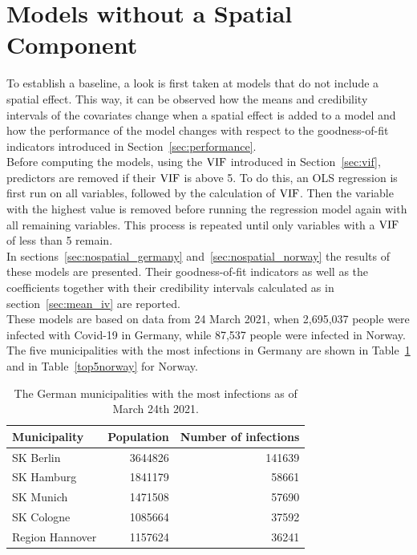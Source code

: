 \section{Models without a Spatial Component}\label{sec:nospatial}
To establish a baseline, a look is first taken at models that do not include a spatial effect. This way, it can be observed how the means and credibility intervals of the covariates change when a spatial effect is added to a model and how the performance of the model changes with respect to the goodness-of-fit indicators introduced in Section~\ref{sec:performance}. \\
Before computing the models, using the $\hbox{VIF}$ introduced in Section~\ref{sec:vif}, predictors are removed if their $\hbox{VIF}$ is above 5. To do this, an OLS regression is first run on all variables, followed by the calculation of $\hbox{VIF}$. Then the variable with the highest value is removed before running the regression model again with all remaining variables. This process is repeated until only variables with a $\hbox{VIF}$ of less than 5 remain. \\
In sections~\ref{sec:nospatial_germany} and~\ref{sec:nospatial_norway} the results of these models are presented. Their goodness-of-fit indicators as well as the coefficients together with their credibility intervals calculated as in section~\ref{sec:mean_iv} are reported. \\
These models are based on data from 24 March 2021, when 2,695,037 people were infected with Covid-19 in Germany, while 87,537 people were infected in Norway. The five municipalities with the most infections in Germany are shown in Table~\ref{top5germany} and in Table~\ref{top5norway} for Norway.
\begin{table}[H] 
\caption{The German municipalities with the most infections as of March 24th 2021. \label{top5germany}}
\begin{tabular}{l r r}
\toprule
\textbf{Municipality}	& \textbf{Population}	& \textbf{Number of infections} \\
\midrule
SK Berlin & 3644826 & 141639   \\     
SK Hamburg & 1841179 & 58661   \\
SK Munich & 1471508 & 57690   \\
SK Cologne & 1085664 & 37592   \\
Region Hannover & 1157624 & 36241   \\
\bottomrule
\end{tabular}
\end{table}
